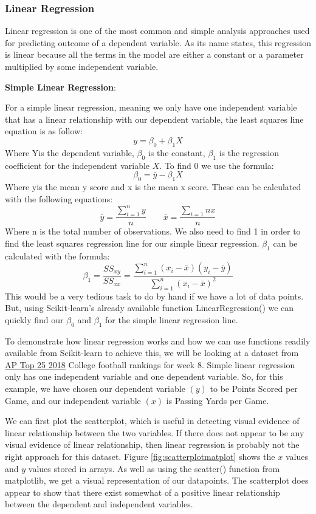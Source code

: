 \documentclass[a4paper,12pt]{report}
\newcommand{\link}[2]{\hyperlink{#1}{\underline{#2}}}
\newcommand{\msection}[1]{\noindent\textbf{#1}}
\begin{document}
\subsubsection{Linear Regression}

Linear regression is one of the most common and simple analysis approaches used for predicting outcome of a dependent variable. As its name states, this regression is linear because all the terms in the model are either a constant or a parameter multiplied by some independent variable.
 
\msection{Simple Linear Regression}:

For a simple linear regression, meaning we only have one independent variable that has a linear relationship with our dependent variable, the least squares line equation is as follow:
$$y=\beta_0+\beta_1X$$
Where Yis the dependent variable, $\beta_0$ is the constant, $\beta_1$ is the regression coefficient for the independent variable $X$.
To find 0 we use the formula:
$$\beta_0=\bar{y}-\beta_1X$$
Where yis the mean y score and x is the mean x score. These can be calculated with the following equations:
$$\bar{y}=\frac{\sum_{i=1}^ny}{n}\qquad\bar{x}=\frac{\sum_{i=1}nx}{n}$$
Where n is the total number of observations. We also need to find 1 in order to find the least squares regression line for our simple linear regression. $\beta_1$ can be calculated with the formula:
$$\beta_1=\frac{SS_{xy}}{SS_{xx}}=\frac{\sum_{i=1}^n(x_i-\bar{x})(y_i-\bar{y})}{\sum_{i=1}^n(x_i-\bar{x})^2}$$
This would be a very tedious task to do by hand if we have a lot of data points. But, using Scikit-learn’s already available function LinearRegression() we can quickly find our $\beta_0$ and $\beta_1$ for the simple linear regression line.

To demonstrate how linear regression works and how we can use functions readily available from Scikit-learn to achieve this, we will be looking at a dataset from \link{http://www.espn.com/college-football/rankings}{AP Top 25 2018} College football rankings for week 8. Simple linear regression only has one independent variable and one dependent variable. So, for this example, we have chosen our dependent variable $(y)$ to be Points Scored per Game, and our independent variable $(x)$ is Passing Yards per Game.

We can first plot the scatterplot, which is useful in detecting visual evidence of linear relationship between the two variables. If there does not appear to be any visual evidence of linear relationship, then linear regression is probably not the right approach for this dataset. Figure \ref{fig:scatterplotmatplot} shows the $x$ values and $y$ values stored in arrays. As well as using the scatter() function from matplotlib, we get a visual representation of our datapoints. The scatterplot does appear to show that there exist somewhat of a positive linear relationship between the dependent and independent variables. 
\end{document}
